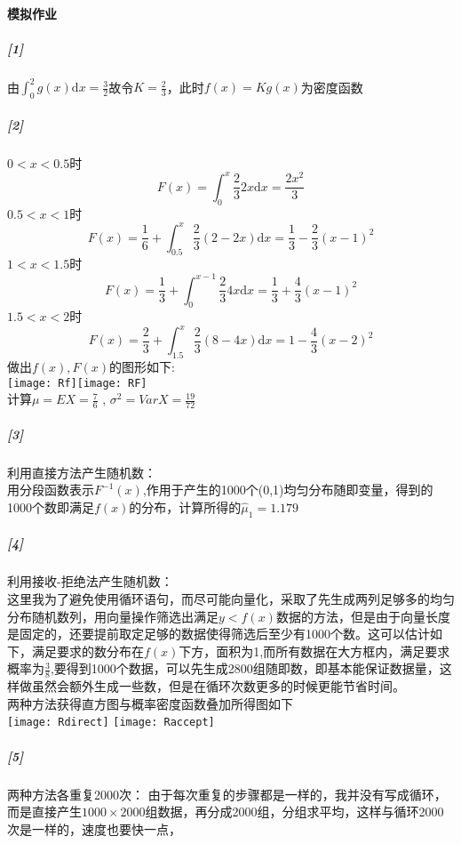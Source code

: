 \documentclass[11pt,a4paper]{ctexart}
\title{\vspace{-5ex}}
\author{基科32 曾柯又 2013012266}
\date{\vspace{-5ex}}
\newcommand{\dd}[0]{\mathrm{d}}
\begin{document}
\abovedisplayskip=5pt
\belowdisplayskip=5pt
\abovedisplayshortskip=0pt
\belowdisplayshortskip=0pt
\maketitle
\paragraph{模拟作业}
\subparagraph{[1]}
由\(\displaystyle \int_{0}^{2}g(x)\mathrm{d}x = \frac{3}{2}\)故令\(K = \frac{2}{3}\)，此时\(f(x) = Kg(x)\)为密度函数
\subparagraph{[2]}
\(0 < x < 0.5\)时
\[F(x) = \int_{0}^{x}\frac{2}{3}2x\dd x = \frac{2x^2}{3} \]
\(0.5 < x < 1\)时
\[F(x) = \frac{1}{6} + \int_{0.5}^{x}\frac{2}{3}(2 - 2x)\dd x = \frac{1}{3} - \frac{2}{3}(x - 1)^2\]
\(1 < x < 1.5\)时
\[F(x) = \frac{1}{3} + \int_{0}^{x - 1}\frac{2}{3}4x\dd x = \frac{1}{3} + \frac{4}{3}(x - 1)^2\]
\(1.5 < x < 2\)时
\[F(x) = \frac{2}{3} + \int_{1.5}^{x}\frac{2}{3}(8 - 4x)\dd x = 1 - \frac{4}{3}(x - 2)^2  \]
做出\(f(x),F(x)\)的图形如下:\\
\texttt{[image: Rf]}\texttt{[image: RF]}\\
计算\(\displaystyle \mu = EX = \frac{7}{6}\) , \(\displaystyle\sigma^2 = VarX = \frac{19}{72} \)
\subparagraph{[3]}
利用直接方法产生随机数：\\
\indent 用分段函数表示\(F^{-1}(x)\),作用于产生的1000个(0,1)均匀分布随即变量，得到的1000个数即满足\(f(x)\)的分布，计算所得的\(\hat{\mu}_1 = 1.179\)
\subparagraph{[4]}
利用接收-拒绝法产生随机数：\\
\indent 这里我为了避免使用循环语句，而尽可能向量化，采取了先生成两列足够多的均匀分布随机数列，用向量操作筛选出满足\(y < f(x)\)数据的方法，但是由于向量长度是固定的，还要提前取定足够的数据使得筛选后至少有1000个数。这可以估计如下，满足要求的数分布在\(f(x)\)下方，面积为1,而所有数据在大方框内，满足要求概率为\(\frac{3}{8}\),要得到1000个数据，可以先生成2800组随即数，即基本能保证数据量，这样做虽然会额外生成一些数，但是在循环次数更多的时候更能节省时间。\\
两种方法获得直方图与概率密度函数叠加所得图如下\\
{\centering \texttt{[image: Rdirect]} \texttt{[image: Raccept]}}
\subparagraph{[5]}
两种方法各重复2000次：
由于每次重复的步骤都是一样的，我并没有写成循环，而是直接产生\(1000\times2000\)组数据，再分成2000组，分组求平均，这样与循环2000次是一样的，速度也要快一点，
\end{document}
